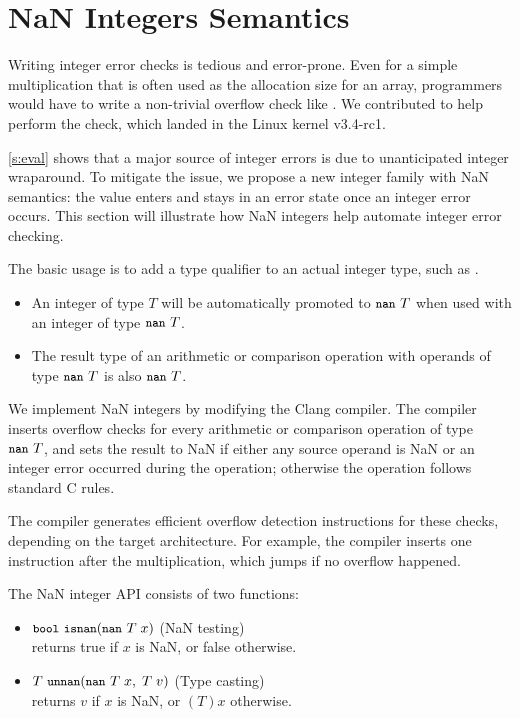 \section{NaN Integers Semantics}
\label{s:miti}

Writing integer error checks is tedious and error-prone.
Even for a simple multiplication  that is often used
as the allocation size for an array, programmers would
have to write a non-trivial overflow check like .  We contributed 
to help perform the check, which landed in the Linux kernel v3.4-rc1.
\fi

\autoref{s:eval} shows that a major source of integer errors is due
to unanticipated integer wraparound.  To mitigate the issue, we
propose a new integer family with NaN semantics: the value enters
and stays in an error state once an integer error occurs.
%
This section will illustrate how NaN integers help automate integer
error checking.

The basic usage is to add a type qualifier 
to an actual integer type, such as .
\begin{itemize}
\item
An integer of type $T$ will be automatically promoted to $\cc{nan}\ T$
when used with an integer of type $\cc{nan}\ T$.
\item
The result type of an arithmetic or comparison operation with
operands of type $\cc{nan}\ T$ is also $\cc{nan}\ T$.
\end{itemize}

We implement NaN integers by modifying the Clang compiler.
The compiler inserts overflow checks for every arithmetic or
comparison operation of type $\cc{nan}\ T$, and sets the result to
NaN if either any source operand is NaN or an integer error occurred
during the operation; otherwise the operation follows standard C rules.

The compiler generates efficient overflow detection instructions
for these checks, depending on the target architecture.  For example,
the compiler inserts one  instruction after the multiplication,
which jumps if no overflow happened.

The NaN integer API consists of two functions:
\begin{itemize}
\item
$\cc{bool}\ \cc{isnan}(\cc{nan}\ T\; x)$ \hfill (NaN testing) \\
returns true if $x$ is NaN, or false otherwise.
\item
$T\ \cc{unnan}(\cc{nan}\ T\; x,\; T\; v)$ \hfill (Type casting) \\
returns $v$ if $x$ is NaN, or $(T)x$ otherwise.
\end{itemize}

